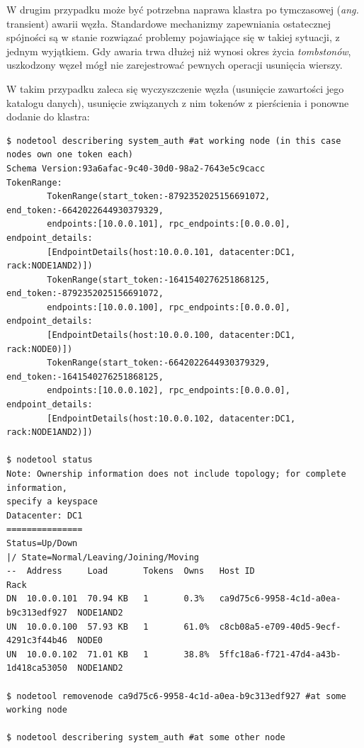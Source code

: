 \documentclass{article} %
\begin{document}
\bigskip

W drugim przypadku może być potrzebna naprawa klastra po tymczasowej (\emph{ang.} transient) awarii węzła.
Standardowe mechanizmy zapewniania ostatecznej  spójności są w stanie rozwiązać problemy pojawiające się w takiej sytuacji, z jednym wyjątkiem.
Gdy awaria trwa dłużej niż wynosi okres życia \emph{tombstonów}, uszkodzony węzeł mógł nie zarejestrować pewnych operacji usunięcia wierszy.

W takim przypadku zaleca się wyczyszczenie węzła (usunięcie zawartości jego katalogu danych), usunięcie związanych z nim tokenów z pierścienia i ponowne dodanie do klastra:

\begin{lstlisting}[style=bash, caption={usuwanie węzła z nieaktualnymi danymi z klastra}]
$ nodetool describering system_auth #at working node (in this case nodes own one token each)
Schema Version:93a6afac-9c40-30d0-98a2-7643e5c9cacc
TokenRange:
        TokenRange(start_token:-8792352025156691072, end_token:-6642022644930379329,
        endpoints:[10.0.0.101], rpc_endpoints:[0.0.0.0], endpoint_details:
        [EndpointDetails(host:10.0.0.101, datacenter:DC1, rack:NODE1AND2)])
        TokenRange(start_token:-1641540276251868125, end_token:-8792352025156691072,
        endpoints:[10.0.0.100], rpc_endpoints:[0.0.0.0], endpoint_details:
        [EndpointDetails(host:10.0.0.100, datacenter:DC1, rack:NODE0)])
        TokenRange(start_token:-6642022644930379329, end_token:-1641540276251868125,
        endpoints:[10.0.0.102], rpc_endpoints:[0.0.0.0], endpoint_details:
        [EndpointDetails(host:10.0.0.102, datacenter:DC1, rack:NODE1AND2)])

$ nodetool status
Note: Ownership information does not include topology; for complete information,
specify a keyspace
Datacenter: DC1
===============
Status=Up/Down
|/ State=Normal/Leaving/Joining/Moving
--  Address     Load       Tokens  Owns   Host ID                               Rack
DN  10.0.0.101  70.94 KB   1       0.3%   ca9d75c6-9958-4c1d-a0ea-b9c313edf927  NODE1AND2
UN  10.0.0.100  57.93 KB   1       61.0%  c8cb08a5-e709-40d5-9ecf-4291c3f44b46  NODE0
UN  10.0.0.102  71.01 KB   1       38.8%  5ffc18a6-f721-47d4-a43b-1d418ca53050  NODE1AND2

$ nodetool removenode ca9d75c6-9958-4c1d-a0ea-b9c313edf927 #at some working node

$ nodetool describering system_auth #at some other node
\end{lstlisting}
\end{document}
